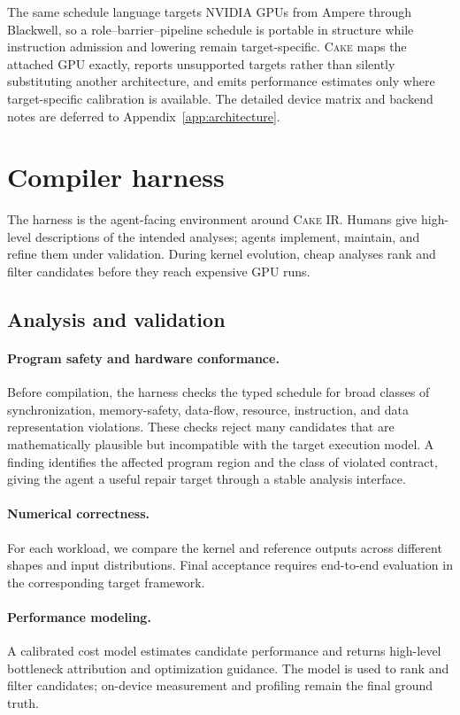 \documentclass[11pt]{article}
\newcommand{\cake}{\textsc{Cake}}
\newcommand{\cakeir}{\textsc{Cake IR}}
\begin{document}
The same schedule language targets NVIDIA GPUs from Ampere through Blackwell,
so a role--barrier--pipeline schedule is portable in structure while instruction
admission and lowering remain target-specific. \cake{} maps the attached GPU
exactly, reports unsupported targets rather than silently substituting another
architecture, and emits performance estimates only where target-specific
calibration is available. The detailed device matrix and backend notes are
deferred to Appendix~\ref{app:architecture}.

\section{Compiler harness}
\label{sec:harness}

The harness is the agent-facing environment around \cakeir{}. Humans give
high-level descriptions of the intended analyses; agents implement, maintain,
and refine them under validation. During kernel evolution, cheap analyses rank
and filter candidates before they reach expensive GPU runs.

\subsection{Analysis and validation}
\label{sec:analysis}

\paragraph{Program safety and hardware conformance.}
Before compilation, the harness checks the typed schedule for broad classes of
synchronization, memory-safety, data-flow, resource, instruction, and data
representation violations. These checks reject many candidates that are
mathematically plausible but incompatible with the target execution model. A
finding identifies the affected program region and the class of violated
contract, giving the agent a useful repair target through a stable analysis
interface.

\paragraph{Numerical correctness.}
For each workload, we compare the kernel and reference outputs across different
shapes and input distributions. Final acceptance requires end-to-end evaluation
in the corresponding target framework.

\paragraph{Performance modeling.}
A calibrated cost model estimates candidate performance and returns high-level
bottleneck attribution and optimization guidance. The model is used to rank and
filter candidates; on-device measurement and profiling remain the final ground
truth.
\end{document}
